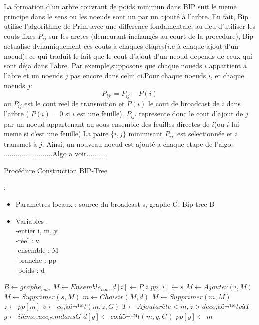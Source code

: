 La formation d'un arbre couvrant de poids minimun dans BIP suit le meme principe dans le sens ou les noeuds sont un par un ajouté à l'arbre.
En fait, Bip utilise l'algorithme de Prim avec une difference fondamentale: au lieu d'utiliser les couts fixes $P_{ij}$ sur les aretes (demeurant inchangés au court de la procedure),
Bip actualise dynamiquement ces couts à chaques étapes($i.e$ à chaque ajout d'un noeud), ce qui traduit le fait que le cout d'ajout d'un neoud depends de ceux qui sont déja dans l'abre.
Par exemple,supposons que chaque noueds $i$ appartient a l'abre et un noeuds $j$ pas encore dans celui ci.Pour chaque noeuds $i$, et chaque noeuds $j$:
$$P_{ij'}=P_{ij}-P(i)$$
ou $P_{ij}$ est le cout reel de transmition et $P(i)$ le cout de broadcast de $i$ dans l'arbre ( $P(i)=0$ si $i$ est une feuille). $P_{ij'}$ represente donc le cout d'ajout de $j$ par un noeud appartenant au sous ensemble des feuilles
 directes de $i$(ou $i$ lui meme si c'est une feuille).La paire $\{i,j\}$ minimisant $P_{ij'}$ est selectionnée et $i$ transmet à $j$. Ainsi, un nouveau noeud est ajouté a chaque etape de l'algo.\\

.........................Algo a voir...........

\begin{algorithm}[h]
\caption{Procédure Construction BIP-Tree}
\label{algo_LBIP_sp}
\begin{algorithmic}
\REQUIRE:
\begin{itemize}
 \item Paramètres locaux : source du broadcast s, graphe G, Bip-tree B
 \item  Variables : \\
  -entier i, m, y\\
  -réel : v\\
  -ensemble : M\\
  -branche : pp\\
  -poids : d \\
\end{itemize}


\STATE  $B \leftarrow graphe_{vide}$
\STATE  $M \leftarrow Ensemble_{vide}$
    \STATE $d[i] \leftarrow P_si$
    \STATE $pp[i] \leftarrow s$ 
    \STATE $M \leftarrow Ajouter (i,M)$
  \ENDFOR
  \STATE $M \leftarrow Supprimer (s,M)$
   \STATE $m \leftarrow Choisir (M,d)$
   \STATE $M \leftarrow Supprimer (m,M)$
   \STATE $z \leftarrow pp[m]$
   \STATE $v \leftarrow co‚àö¬™t (m,z,G)$
   \STATE $T \leftarrow Ajout arête <m,z> de co‚àö¬™t v à T$
     \STATE $y \leftarrow i ième_succ_de m dans G$
       \STATE $d[y] \leftarrow co‚àö¬™t(m,y,G)$
       \STATE $pp[y] \leftarrow m$
     \ENDIF
    \ENDFOR
\ENDWHILE


\end{algorithmic}
\end{algorithm}

